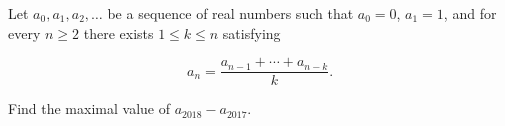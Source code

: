 Let $a_0, a_1, a_2, \dots$ be a sequence of real numbers such that $a_0 = 0$, $a_1 = 1$, and for every $n \ge 2$ there exists $1 \le k \le n$ satisfying

$$a_n = \dfrac{a_{n-1} + \cdots + a_{n-k}}{k}.$$

Find the maximal value of $a_{2018} - a_{2017}$.